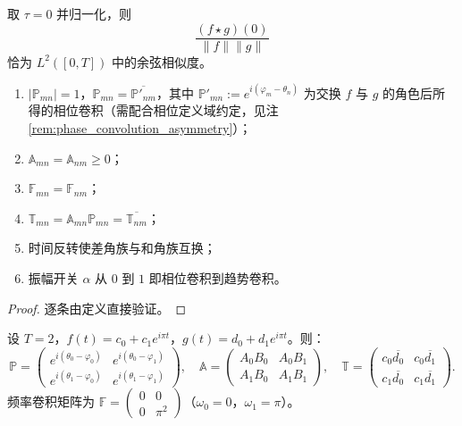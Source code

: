 \begin{corollary}[零时延与余弦相似度]\label{cor:zero_delay_cosine}
取 $\tau = 0$ 并归一化，则
\[
\frac{(f \star g)(0)}{\|f\| \|g\|}
\]
恰为 $L^2([0,T])$ 中的余弦相似度。
\end{corollary}

\begin{property}\label{prop:convolution_types_properties}
\begin{enumerate}[label=(\roman*)]
    \item $|\mathbb{P}_{mn}| = 1$，$\mathbb{P}_{mn} = \overline{\mathbb{P}'_{nm}}$，其中 $\mathbb{P}'_{mn} := e^{i(\varphi_m - \theta_n)}$ 为交换 $f$ 与 $g$ 的角色后所得的相位卷积（需配合相位定义域约定，见注 \ref{rem:phase_convolution_asymmetry}）；
    \item $\mathbb{A}_{mn} = \mathbb{A}_{nm} \ge 0$；
    \item $\mathbb{F}_{mn} = \mathbb{F}_{nm}$；
    \item $\mathbb{T}_{mn} = \mathbb{A}_{mn} \mathbb{P}_{mn} = \overline{\mathbb{T}_{nm}}$；
    \item 时间反转使差角族与和角族互换；
    \item 振幅开关 $\alpha$ 从 $0$ 到 $1$ 即相位卷积到趋势卷积。
\end{enumerate}
\end{property}

\begin{proof}
逐条由定义直接验证。
\end{proof}

\begin{example}\label{ex:period_two_matrix}
设 $T = 2$，$f(t) = c_0 + c_1 e^{i\pi t}$，$g(t) = d_0 + d_1 e^{i\pi t}$。则：
\[
\mathbb{P} = \begin{pmatrix}
e^{i(\theta_0 - \varphi_0)} & e^{i(\theta_0 - \varphi_1)} \\
e^{i(\theta_1 - \varphi_0)} & e^{i(\theta_1 - \varphi_1)}
\end{pmatrix}, \quad
\mathbb{A} = \begin{pmatrix}
A_0 B_0 & A_0 B_1 \\
A_1 B_0 & A_1 B_1
\end{pmatrix}, \quad
\mathbb{T} = \begin{pmatrix}
c_0 \overline{d_0} & c_0 \overline{d_1} \\
c_1 \overline{d_0} & c_1 \overline{d_1}
\end{pmatrix}.
\]
频率卷积矩阵为 $\mathbb{F} = \begin{pmatrix} 0 & 0 \\ 0 & \pi^2 \end{pmatrix}$（$\omega_0 = 0$，$\omega_1 = \pi$）。
\end{example}

